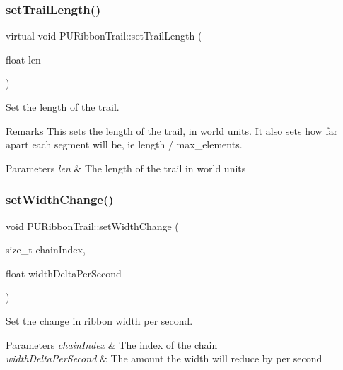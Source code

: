 \subsubsection{\texorpdfstring{set\+Trail\+Length()}{setTrailLength()}\hspace{0.1cm}{\footnotesize\ttfamily [2/2]}}
{\footnotesize\ttfamily virtual void P\+U\+Ribbon\+Trail\+::set\+Trail\+Length (\begin{DoxyParamCaption}\item[{float}]{len }\end{DoxyParamCaption})\hspace{0.3cm}{\ttfamily [virtual]}}

Set the length of the trail. \begin{DoxyRemark}{Remarks}
This sets the length of the trail, in world units. It also sets how far apart each segment will be, ie length / max\+\_\+elements. 
\end{DoxyRemark}

\begin{DoxyParams}{Parameters}
{\em len} & The length of the trail in world units \\
\hline
\end{DoxyParams}
\mbox{\label{classPURibbonTrail_a744d20056345182e98e7e8a54657fd0b}} 
\subsubsection{\texorpdfstring{set\+Width\+Change()}{setWidthChange()}\hspace{0.1cm}{\footnotesize\ttfamily [1/2]}}
{\footnotesize\ttfamily void P\+U\+Ribbon\+Trail\+::set\+Width\+Change (\begin{DoxyParamCaption}\item[{size\+\_\+t}]{chain\+Index,  }\item[{float}]{width\+Delta\+Per\+Second }\end{DoxyParamCaption})\hspace{0.3cm}{\ttfamily [virtual]}}

Set the change in ribbon width per second. 
\begin{DoxyParams}{Parameters}
{\em chain\+Index} & The index of the chain \\
\hline
{\em width\+Delta\+Per\+Second} & The amount the width will reduce by per second \\
\hline
\end{DoxyParams}
\mbox{\label{classPURibbonTrail_af3b7d47b5cf1b0bc44f851019601c070}} 
